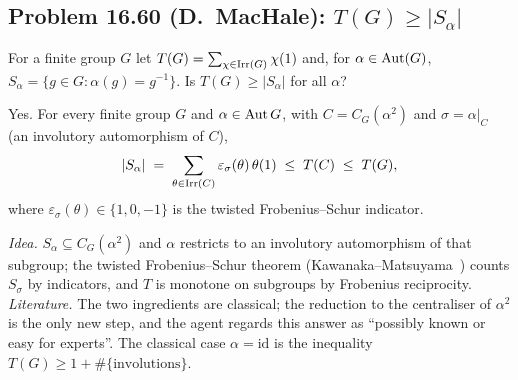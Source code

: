 \subsection{Problem 16.60 (D.~MacHale): $T(G)\ge |S_\alpha|$}
\begin{problem}[16.60]
For a finite group $G$ let $T(G)=\sum_{\chi\in\operatorname{Irr}(G)}\chi(1)$ and, for $\alpha\in\operatorname{Aut}(G)$, $S_\alpha=\{g\in G:
\alpha(g)=g^{-1}\}$. Is $T(G)\ge |S_\alpha|$ for all $\alpha$?
\end{problem}
\begin{theorem}\label{thm:1660}
Yes. For every finite group $G$ and $\alpha\in\operatorname{Aut} G$, with $C=C_G(\alpha^2)$ and $\sigma=\alpha|_C$ (an
involutory automorphism of $C$),
\[ |S_\alpha| \;=\; \sum_{\theta\in\operatorname{Irr}(C)}\varepsilon_\sigma(\theta)\,\theta(1)\;\le\; T(C)\;\le\; T(G), \]
where $\varepsilon_\sigma(\theta)\in\{1,0,-1\}$ is the twisted Frobenius--Schur indicator.
\end{theorem}
\emph{Idea.} $S_\alpha\subseteq C_G(\alpha^2)$ and $\alpha$ restricts to an involutory automorphism of that
subgroup; the twisted Frobenius--Schur theorem (Kawanaka--Matsuyama~\cite{KM}) counts $S_\sigma$ by indicators, and
$T$ is monotone on subgroups by Frobenius reciprocity. \emph{Literature.} The two ingredients are classical; the
reduction to the centraliser of $\alpha^2$ is the only new step, and the agent regards this answer as ``possibly
known or easy for experts''. The classical case $\alpha=\mathrm{id}$ is the inequality $T(G)\ge 1+\#\{\text{involutions}\}$.

